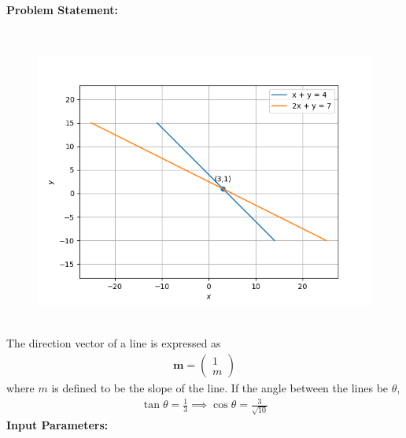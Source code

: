 \documentclass[10pt,a4paper]{report}
\newcommand{\myvec}[1]{\ensuremath{\begin{pmatrix}#1\end{pmatrix}}}
\let\vec\mathbf
\let\vec\mathbf
\begin{document}
\begin{multicols}{2}

\raggedright \textbf{Problem Statement:}\vspace{2mm}
\raggedright \\
\fi
	\begin{figure}[!ht]
		\centering
 \includegraphics[width=\columnwidth]{chapters/11/10/1/11/figs/line.png}
		\caption{}
		\label{fig:11/10/1/11}
  	\end{figure}

\\
\solution 
The direction vector of a line is expressed as
\begin{align}
\vec{m}=\myvec{1\\m}
\end{align}
where  $m$ is defined to be the slope of the line. If the angle between the lines be $\theta$,
\begin{align}
\tan \theta = \frac{1}{3}
\implies \cos \theta=\frac{3}{\sqrt{10}}
\end{align}
\iffalse
\textbf{Input Parameters:}
\vspace{2mm}



\end{multicols}
\end{document}
